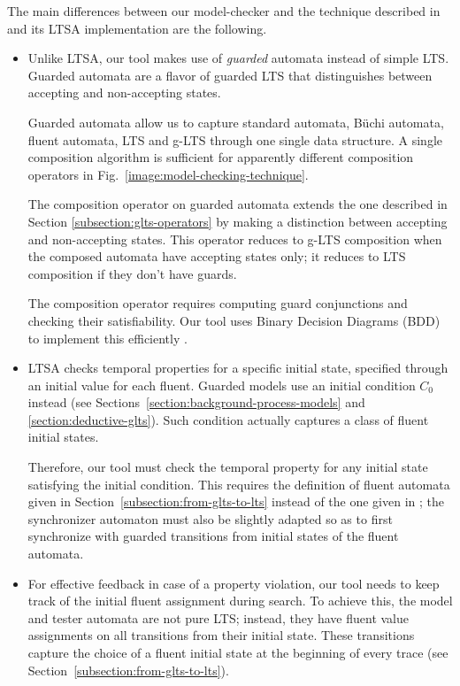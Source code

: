 The main differences between our model-checker and the technique described in \cite{Giannakopoulou:2003} and its LTSA implementation are the following.
\begin{itemize}

\item Unlike LTSA, our tool makes use of \emph{guarded} automata instead of simple LTS. Guarded automata are a flavor of guarded LTS that distinguishes between accepting and non-accepting states. 

Guarded automata allow us to capture standard automata, B\"uchi automata, fluent automata, LTS and g-LTS through one single data structure. A single composition algorithm is sufficient for apparently different composition operators in Fig.~\ref{image:model-checking-technique}. 

The composition operator on guarded automata extends the one described in Section \ref{subsection:glts-operators} by making a distinction between accepting and non-accepting states. This operator reduces to g-LTS composition when the composed automata have accepting states only; it reduces to LTS composition if they don't have guards. 

The composition operator requires computing guard conjunctions and checking their satisfiability. Our tool uses Binary Decision Diagrams (BDD) to implement this efficiently \cite{Bryant:1986}. 

\item LTSA checks temporal properties for a specific initial state, specified through an initial value for each fluent. Guarded models use an initial condition $C_0$ instead (see Sections~\ref{section:background-process-models} and \ref{section:deductive-glts}). Such condition actually captures a class of fluent initial states. 

Therefore, our tool must check the temporal property for any initial state satisfying the initial condition. This requires the definition of fluent automata given in Section~\ref{subsection:from-glts-to-lts} instead of the one given in \cite{Giannakopoulou:2003}; the synchronizer automaton must also be slightly adapted so as to first synchronize with guarded transitions from initial states of the fluent automata.

\item For effective feedback in case of a property violation, our tool needs to keep track of the initial fluent assignment during search. To achieve this, the model and tester automata are not pure LTS; instead, they have fluent value assignments on all transitions from their initial state. These transitions capture the choice of a fluent initial state at the beginning of every trace (see Section~\ref{subsection:from-glts-to-lts}). 

\end{itemize}

